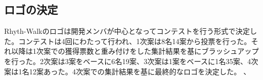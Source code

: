 \subsection{ロゴの決定}
\par Rhyth-Walkのロゴは開発メンバが中心となってコンテストを行う形式で決定した。コンテストは4回にわたって行われ、1次案は8名14案から投票を行った。それ以降は1次案での獲得票数と重み付けをした集計結果を基にブラッシュアップを行った。2次案は3案をベースに6名19案、3次案は1案をベースに1名35案、4次案は1名12案あった。4次案での集計結果を基に最終的なロゴを決定した。
、
